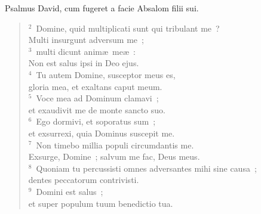 \lettrine[lines=3,image=true,loversize=0.05,lraise=-0.03]{P}{}salmus David, cum fugeret a facie Absalom filii sui.
\begin{flushleft}\begin{verse}\vspace{6pt}${}^{2}$~Domine, quid multiplicati sunt qui tribulant me~?\\ Multi insurgunt adversum me~;\\
${}^{3}$~multi dicunt anim\ae\ me\ae~:\\ Non est salus ipsi in Deo ejus.\\
${}^{4}$~Tu autem Domine, susceptor meus es,\\ gloria mea, et exaltans caput meum.\\
${}^{5}$~Voce mea ad Dominum clamavi~;\\ et exaudivit me de monte sancto suo.\\
${}^{6}$~Ego dormivi, et soporatus sum~;\\ et exsurrexi, quia Dominus suscepit me.\\
${}^{7}$~Non timebo millia populi circumdantis me.\\ Exsurge, Domine~; salvum me fac, Deus meus.\\
${}^{8}$~Quoniam tu percussisti omnes adversantes mihi sine causa~;\\ dentes peccatorum contrivisti.\\
${}^{9}$~Domini est salus~;\\ et super populum tuum benedictio tua.\end{verse}\end{flushleft}



